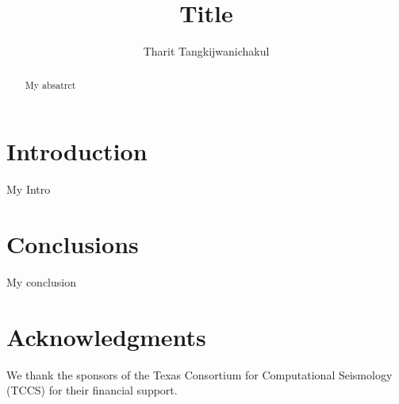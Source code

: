 \renewcommand{\thefootnote}{\fnsymbol{footnote}}
\title{Title}
\relax{}
\author{Tharit Tangkijwanichakul}
\label{ch:chapter-lsrtm}

\maketitle

\begin{abstract}
        My absatrct
\end{abstract}

\section{Introduction}
        My Intro

\section{Conclusions}
        My conclusion
\section{Acknowledgments}
        We thank the sponsors of the Texas Consortium for Computational Seismology (TCCS) for their financial support.
